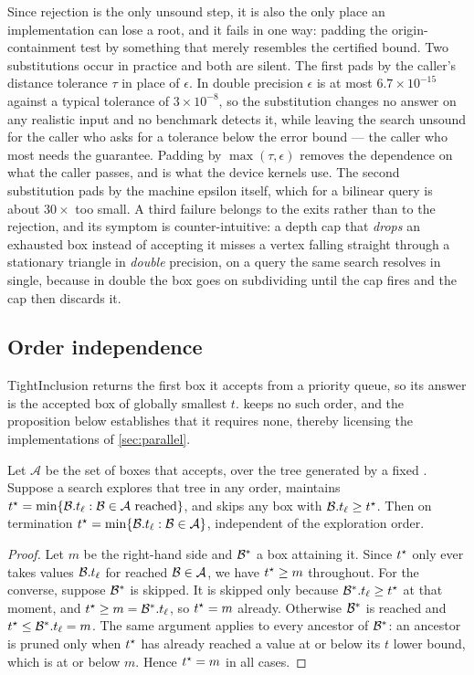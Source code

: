 Since rejection is the only unsound step, it is also the only place an
implementation can lose a root, and it fails in one way: padding the
origin-containment test by something that merely resembles the certified bound.
Two substitutions occur in practice and both are silent. The first pads by the
caller's distance tolerance $\tau$ in place of $\epsilon$. In double precision
$\epsilon$ is at most $6.7\times10^{-15}$ against a typical tolerance of
$3\times10^{-8}$, so the substitution changes no answer on any realistic input and
no benchmark detects it, while leaving the search unsound for the caller who asks
for a tolerance below the error bound --- the caller who most needs the
guarantee. Padding by $\max(\tau,\epsilon)$ removes the dependence on what the
caller passes, and is what the device kernels use. The second substitution pads
by the machine epsilon itself, which for a bilinear query is about $30\times$ too
small. A third failure belongs to the exits rather than to the rejection, and its
symptom is counter-intuitive: a depth cap that \emph{drops} an exhausted box
instead of accepting it misses a vertex falling straight through a stationary
triangle in \emph{double} precision, on a query the same search resolves in
single, because in double the box goes on subdividing until the cap fires and the
cap then discards it.

\subsection{Order independence}
\label{sec:np:order}

TightInclusion returns the first box it accepts from a priority queue, so its
answer is the accepted box of globally smallest $t$.  keeps no such
order, and the proposition below establishes that it requires none, thereby
licensing the implementations of \cref{sec:parallel}.

\begin{proposition}
\label{prop:order}
Let $\mathcal{A}$ be the set of boxes that  accepts, over the tree
generated by a fixed . Suppose a search explores that tree in any
order, maintains $t^{\star} = \min\{\mathcal{B}.t_{\ell} : \mathcal{B} \in \mathcal{A}
\text{ reached}\}$, and skips any box with $\mathcal{B}.t_{\ell} \ge t^{\star}$. Then on
termination $t^{\star} = \min\{\mathcal{B}.t_{\ell} : \mathcal{B} \in \mathcal{A}\}$, independent of
the exploration order.
\end{proposition}

\begin{proof}
Let $m$ be the right-hand side and $\mathcal{B}^{\ast}$ a box attaining it. Since $t^{\star}$
only ever takes values $\mathcal{B}.t_{\ell}$ for reached $\mathcal{B} \in \mathcal{A}$, we
have $t^{\star} \ge m$ throughout. For the converse, suppose $\mathcal{B}^{\ast}$ is skipped.
It is skipped only because $\mathcal{B}^{\ast}.t_{\ell} \ge t^{\star}$ at that moment, and
$t^{\star} \ge m = \mathcal{B}^{\ast}.t_{\ell}$, so $t^{\star} = m$ already. Otherwise
$\mathcal{B}^{\ast}$ is reached and $t^{\star} \le \mathcal{B}^{\ast}.t_{\ell} = m$. The same
argument applies to every ancestor of $\mathcal{B}^{\ast}$: an ancestor is pruned only
when $t^{\star}$ has already reached a value at or below its $t$ lower bound, which is
at or below $m$. Hence $t^{\star} = m$ in all cases.
\end{proof}

